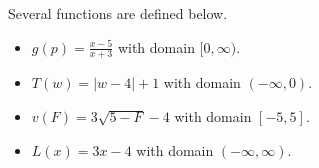 \documentclass{ximera}
\begin{document}
\begin{definition}
Several functions are defined below.
\begin{itemize}
\item $g(p) = \frac{x-5}{x+3}$ with domain $[0, \infty)$. \\ \quad
\item $T(w) = | w - 4 | + 1$ with domain $(-\infty, 0)$. 
\item $v(F) = 3\sqrt{5 - F} - 4$ with domain $[-5, 5]$. 
\item $L(x) = 3x - 4$ with domain $(-\infty, \infty)$. 
\end{itemize}
\end{definition}
\end{document}
